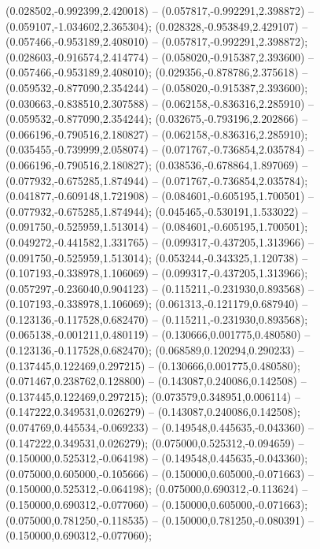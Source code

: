  (0.028502,-0.992399,2.420018) -- (0.057817,-0.992291,2.398872) -- (0.059107,-1.034602,2.365304);
 (0.028328,-0.953849,2.429107) -- (0.057466,-0.953189,2.408010) -- (0.057817,-0.992291,2.398872);
 (0.028603,-0.916574,2.414774) -- (0.058020,-0.915387,2.393600) -- (0.057466,-0.953189,2.408010);
 (0.029356,-0.878786,2.375618) -- (0.059532,-0.877090,2.354244) -- (0.058020,-0.915387,2.393600);
 (0.030663,-0.838510,2.307588) -- (0.062158,-0.836316,2.285910) -- (0.059532,-0.877090,2.354244);
 (0.032675,-0.793196,2.202866) -- (0.066196,-0.790516,2.180827) -- (0.062158,-0.836316,2.285910);
 (0.035455,-0.739999,2.058074) -- (0.071767,-0.736854,2.035784) -- (0.066196,-0.790516,2.180827);
 (0.038536,-0.678864,1.897069) -- (0.077932,-0.675285,1.874944) -- (0.071767,-0.736854,2.035784);
 (0.041877,-0.609148,1.721908) -- (0.084601,-0.605195,1.700501) -- (0.077932,-0.675285,1.874944);
 (0.045465,-0.530191,1.533022) -- (0.091750,-0.525959,1.513014) -- (0.084601,-0.605195,1.700501);
 (0.049272,-0.441582,1.331765) -- (0.099317,-0.437205,1.313966) -- (0.091750,-0.525959,1.513014);
 (0.053244,-0.343325,1.120738) -- (0.107193,-0.338978,1.106069) -- (0.099317,-0.437205,1.313966);
 (0.057297,-0.236040,0.904123) -- (0.115211,-0.231930,0.893568) -- (0.107193,-0.338978,1.106069);
 (0.061313,-0.121179,0.687940) -- (0.123136,-0.117528,0.682470) -- (0.115211,-0.231930,0.893568);
 (0.065138,-0.001211,0.480119) -- (0.130666,0.001775,0.480580) -- (0.123136,-0.117528,0.682470);
 (0.068589,0.120294,0.290233) -- (0.137445,0.122469,0.297215) -- (0.130666,0.001775,0.480580);
 (0.071467,0.238762,0.128800) -- (0.143087,0.240086,0.142508) -- (0.137445,0.122469,0.297215);
 (0.073579,0.348951,0.006114) -- (0.147222,0.349531,0.026279) -- (0.143087,0.240086,0.142508);
 (0.074769,0.445534,-0.069233) -- (0.149548,0.445635,-0.043360) -- (0.147222,0.349531,0.026279);
 (0.075000,0.525312,-0.094659) -- (0.150000,0.525312,-0.064198) -- (0.149548,0.445635,-0.043360);
 (0.075000,0.605000,-0.105666) -- (0.150000,0.605000,-0.071663) -- (0.150000,0.525312,-0.064198);
 (0.075000,0.690312,-0.113624) -- (0.150000,0.690312,-0.077060) -- (0.150000,0.605000,-0.071663);
 (0.075000,0.781250,-0.118535) -- (0.150000,0.781250,-0.080391) -- (0.150000,0.690312,-0.077060);
